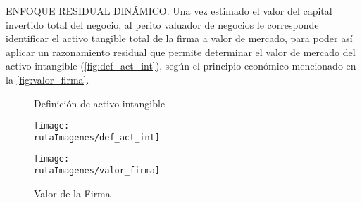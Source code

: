 \textcolor{secundario}{ENFOQUE RESIDUAL DIN\'AMICO}. Una vez estimado el valor del capital invertido total del negocio, al perito valuador de negocios le corresponde identificar el activo tangible total de la firma a valor de mercado, para poder as\'i aplicar un razonamiento residual que permite determinar el valor de mercado del activo intangible (\autoref{fig:def_act_int}), seg\'un el principio econ\'omico mencionado en la \autoref{fig:valor_firma}.

\begin{figure}[H]
\centering
\caption{Definici\'on de activo intangible \label{fig:def_act_int}}
\texttt{[image: \\rutaImagenes/def\_act\_int]}\\

\caption{Valor de la Firma \label{fig:valor_firma}}
\texttt{[image: \\rutaImagenes/valor\_firma]}
\end{figure}